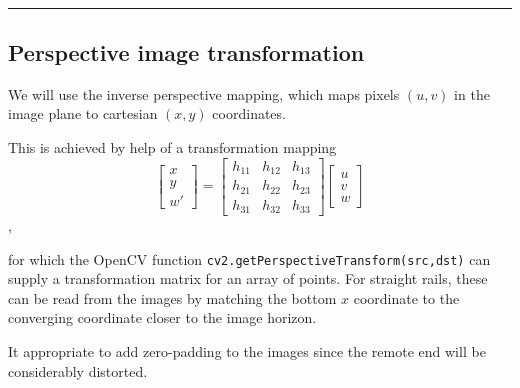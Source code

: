 \documentclass[11pt,a4paper, d]{scrartcl}
\begin{document}
    \begin{center}
    \end{center}
    { \hspace*{\fill} \\}
    
    \begin{center}\rule{0.5\linewidth}{0.5pt}\end{center}

\hypertarget{perspective-image-transformation}{%
\subsection{Perspective image
transformation}\label{perspective-image-transformation}}

We will use the inverse perspective mapping, which maps pixels \((u,v)\)
in the image plane to cartesian \((x,y)\) coordinates.

This is achieved by help of a transformation mapping
\[\begin{bmatrix}x\\y\\w' \end{bmatrix} = \begin{bmatrix} h_{11} & h_{12} & h_{13} \\ h_{21} & h_{22} & h_{23} \\ h_{31} & h_{32} & h_{33}\end{bmatrix} \begin{bmatrix} u\\v\\w\end{bmatrix}\],

for which the OpenCV function
\texttt{cv2.getPerspectiveTransform(src,dst)} can supply a
transformation matrix for an array of points. For straight rails, these
can be read from the images by matching the bottom \(x\) coordinate to
the converging coordinate closer to the image horizon.

It appropriate to add zero-padding to the images since the remote end
will be considerably distorted.
\end{document}
